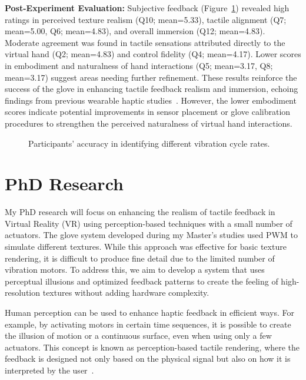 \documentclass[graybox]{svmult}
\begin{document}
\textbf{Post-Experiment Evaluation: }
Subjective feedback (Figure~\ref{fig:questionnaire_results}) revealed high ratings in perceived texture realism (Q10; mean=5.33), tactile alignment (Q7; mean=5.00, Q6; mean=4.83), and overall immersion (Q12; mean=4.83). Moderate agreement was found in tactile sensations attributed directly to the virtual hand (Q2; mean=4.83) and control fidelity (Q4; mean=4.17). Lower scores in embodiment and naturalness of hand interactions (Q5; mean=3.17, Q8; mean=3.17) suggest areas needing further refinement. These results reinforce the success of the glove in enhancing tactile feedback realism and immersion, echoing findings from previous wearable haptic studies~\cite{pacchierotti2017wearable}. However, the lower embodiment scores indicate potential improvements in sensor placement or glove calibration procedures to strengthen the perceived naturalness of virtual hand interactions.

\begin{figure}\centering
	
	\caption{Participants' accuracy in identifying different vibration cycle rates.}\label{fig:questionnaire_results}
\end{figure}

\section{PhD Research}

My PhD research will focus on enhancing the realism of tactile feedback in Virtual Reality (VR) using perception-based techniques with a small number of actuators. The glove system developed during my Master’s studies used PWM to simulate different textures. While this approach was effective for basic texture rendering, it is difficult to produce fine detail due to the limited number of vibration motors. To address this, we aim to develop a system that uses perceptual illusions and optimized feedback patterns to create the feeling of high-resolution textures without adding hardware complexity.

Human perception can be used to enhance haptic feedback in efficient ways. For example, by activating motors in certain time sequences, it is possible to create the illusion of motion or a continuous surface, even when using only a few actuators. This concept is known as perception-based tactile rendering, where the feedback is designed not only based on the physical signal but also on how it is interpreted by the user~\cite{Ujitoko2022,Dandu2021}.
\end{document}
